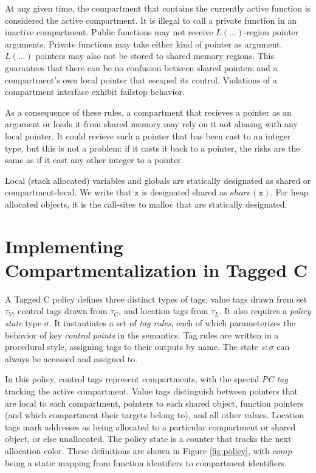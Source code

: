 \documentclass{article}
\begin{document}
At any given time, the compartment that contains the currently active function is
considered the active compartment. It is illegal to call a private function in an
inactive compartment. Public functions may not receive \(L(\dots)\)-region pointer arguments.
Private functions may take either kind of pointer as argument. \(L(\dots)\) pointers
may also not be stored to shared memory regions. This guarantees that there can be no
confusion between shared pointers and a compartment's own local pointer that
escaped its control. Violations of a compartment interface exhibit failstop behavior.

As a consequence of these rules, a compartment that recieves a pointer as an argument
or loads it from shared memory may rely on it not aliasing with any local pointer.
It could recieve such a pointer that has been cast to an integer type, but this is
not a problem: if it casts it back to a pointer, the risks are the same as if it
cast any other integer to a pointer.

Local (stack allocated) variables and globals are statically designated as shared or
compartment-local. We write that \(\mathtt{x}\) is designated shared as \(\mathit{share}(\mathtt{x})\).
For heap allocated objects, it is the call-sites to malloc that are statically designated.

\section{Implementing Compartmentalization in Tagged C}

A Tagged C policy defines three distinct types of tags: value tags 
drawn from set \(\tau_V\), control tags drawn from \(\tau_C\), and location tags
from \(\tau_L\). It also requires a {\it policy state} type \(\sigma\).
It instantiates a set of {\it tag rules}, each of which parameterizes the behavior
of key {\it control points} in the semantics. Tag rules are written in a procedural style,
assigning tags to their outputs by name. The state \(s : \sigma\) can always be accessed
and assigned to.

In this policy, control tags represent compartments, with the special {\it PC tag}
tracking the active compartment. Value tags distinguish between pointers that are local
to each compartment, pointers to each shared object, function pointers
(and which compartment their targets belong to), and all other values.
Location tags mark addresses as being allocated to a particular compartment or shared object, or
else unallocated. The policy state is a counter that tracks the next allocation color.
These definitions are shown in Figure \ref{fig:policy}, with \(\mathit{comp}\) being a
static mapping from function identifiers to compartment identifiers.
\end{document}
